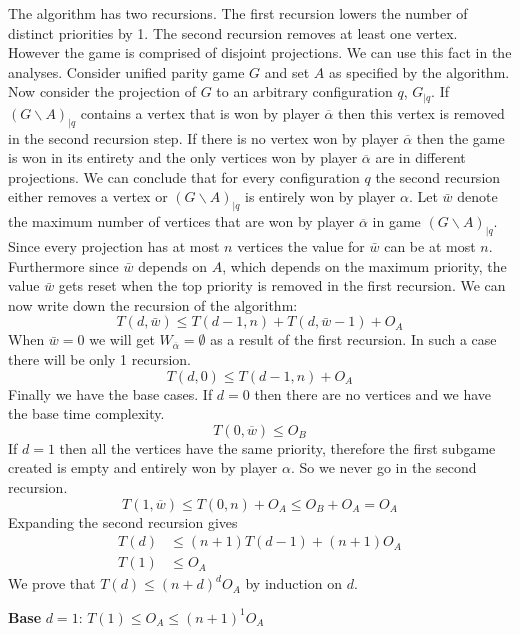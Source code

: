 The algorithm has two recursions. The first recursion lowers the number of distinct priorities by 1. The second recursion removes at least one vertex. However the game is comprised of disjoint projections. We can use this fact in the analyses. Consider unified parity game $G$ and set $A$ as specified by the algorithm. Now consider the projection of $G$ to an arbitrary configuration $q$, $G_{|q}$. If $(G\backslash A)_{|q}$ contains a vertex that is won by player $\overline{\alpha}$ then this vertex is removed in the second recursion step. If there is no vertex won by player $\overline{\alpha}$ then the game is won in its entirety and the only vertices won by player $\overline{\alpha}$ are in different projections. We can conclude that for every configuration $q$ the second recursion either removes a vertex or $(G\backslash A)_{|q}$ is entirely won by player $\alpha$. Let $\bar{w}$ denote the maximum number of vertices that are won by player $\overline{\alpha}$ in game $(G\backslash A)_{|q}$. Since every projection has at most $n$ vertices the value for $\bar{w}$ can be at most $n$. Furthermore since $\bar{w}$ depends on $A$, which depends on the maximum priority, the value $\bar{w}$ gets reset when the top priority is removed in the first recursion. We can now write down the recursion of the algorithm:
\[ T(d,\bar{w}) \leq T(d-1,n) + T(d, \bar{w} - 1) + O_A \]
When $\bar{w} = 0$ we will get $W_{\overline{\alpha}} = \emptyset$ as a result of the first recursion. In such a case there will be only 1 recursion.
\[ T(d,0) \leq T(d-1,n) + O_A \]
Finally we have the base cases. If $d=0$ then there are no vertices and we have the base time complexity.
\[ T(0,\overline{w}) \leq O_B \]
If $d=1$ then all the vertices have the same priority, therefore the first subgame created is empty and entirely won by player $\alpha$. So we never go in the second recursion.
\[ T(1,\overline{w}) \leq T(0,n) + O_A \leq O_B + O_A = O_A \]
Expanding the second recursion gives
\begin{align*}
T(d) &\leq (n+1)T(d-1) + (n+1)O_A\\
T(1) &\leq O_A
\end{align*}
We prove that $T(d) \leq (n+d)^dO_A$ by induction on $d$.

\textbf{Base} $d=1$: $T(1) \leq O_A \leq (n+1)^1O_A$

